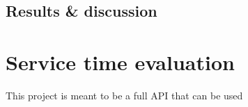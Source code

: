 		\subsection{Results \& discussion} \label{Section: eval/ml/results}
	
	
		\section{Service time evaluation} \label{Section: eval/service-time}
		This project is meant to be a full API that can be used 
